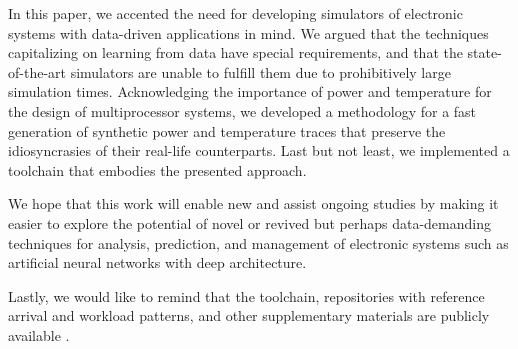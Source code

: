 In this paper, we accented the need for developing simulators of electronic
systems with data-driven applications in mind. We argued that the techniques
capitalizing on learning from data have special requirements, and that the
state-of-the-art simulators are unable to fulfill them due to prohibitively
large simulation times. Acknowledging the importance of power and temperature
for the design of multiprocessor systems, we developed a methodology for a fast
generation of synthetic power and temperature traces that preserve the
idiosyncrasies of their real-life counterparts. Last but not least, we
implemented a toolchain that embodies the presented approach.

We hope that this work will enable new and assist ongoing studies by making it
easier to explore the potential of novel or revived but perhaps data-demanding
techniques for analysis, prediction, and management of electronic systems such
as artificial neural networks with deep architecture.

Lastly, we would like to remind that the toolchain, repositories with reference
arrival and workload patterns, and other supplementary materials are publicly
available \cite{sources}.
